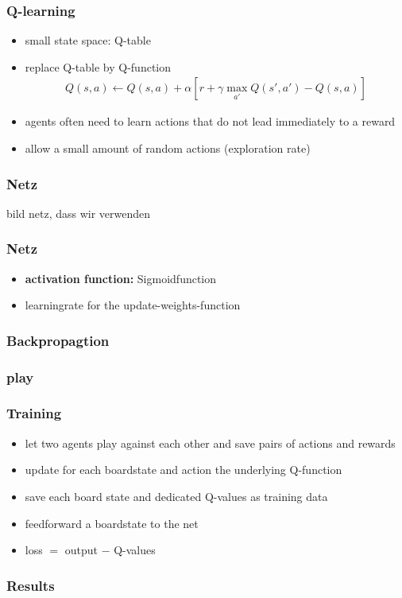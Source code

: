 \documentclass{beamer}
\begin{document}
  \begin{frame}
  \frametitle{Q-learning}
 \begin{itemize}
 \item small state space: Q-table
  \item replace Q-table by Q-function 
  \begin{align}
  Q(s,a) \leftarrow Q(s,a)+\alpha [r+\gamma \max_{a'} Q(s',a') -Q(s,a)]
  \end{align}
 \item agents often need to learn actions that do not lead immediately to a reward
 \item allow a small amount of random actions (exploration rate)
 \end{itemize}
 \end{frame}
 
 \begin{frame}
 \frametitle{Netz}
 bild netz, dass wir verwenden
 \end{frame}
  \begin{frame}
 \frametitle{Netz}
\begin{itemize}
\item \textbf{activation function:} Sigmoidfunction
\item learningrate for the update-weights-function
\end{itemize}
 \end{frame}
 
 \begin{frame}
 \frametitle{Backpropagtion}
 
 \end{frame}
 
 \begin{frame}
 \frametitle{play}
 
 \end{frame}
 
 
 \begin{frame}
 \frametitle{Training}
 \begin{itemize}
\item let two agents play against each other and save pairs of actions and rewards
\item update for each boardstate and action the underlying Q-function
\item save each board state and dedicated Q-values as training data
\item feedforward a boardstate to the net
\item loss $=$ output $-$ Q-values
\end{itemize}
 \end{frame}
 
 \begin{frame}
 \frametitle{Results}
 \end{frame}
\end{document}
